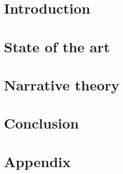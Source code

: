 \documentclass[digital, oneside, table, nolot, nolof]{fithesis4}
\begin{document}
\setlength{\overfullrule}{5pt} %

\chapter{Introduction} \label{chap:uvod}


\chapter{State of the art} \label{chap:state-of-art}


\chapter{Narrative theory} \label{chap:teorie-vypraveni}


\chapter{Conclusion} \label{chap:zaver}


\printbibliography

\appendix
\chapter{Appendix} \label{chap:appendix}

\end{document}
